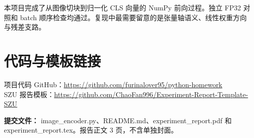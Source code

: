 \documentclass[UTF8,12pt,a4paper]{ctexart}
\begin{document}
本项目完成了从图像切块到归一化 CLS 向量的 NumPy 前向过程。独立 FP32 对照和 batch 顺序检查均通过。复现中最需要留意的是张量轴语义、线性权重方向与残差支路。

\section*{代码与模板链接}
项目代码 GitHub：\url{https://github.com/furinalover95/python-homework}\\
SZU 报告模板：\url{https://github.com/ChaoFan996/Experiment-Report-Template-SZU}

\vspace{0.5em}\noindent\textbf{提交文件：} image\_encoder.py、README.md、experiment\_report.pdf 和 experiment\_report.tex。报告正文 3 页，不含单独封面。
\end{document}

